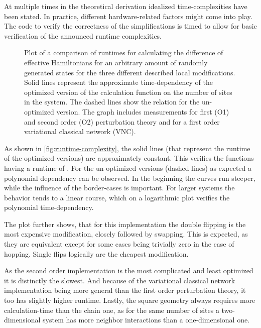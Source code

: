 At multiple times in the theoretical derivation idealized time-complexities have been stated.
In practice, different hardware-related factors might come into play.
The code to verify the correctness of the simplifications is timed to allow for basic verification of the announced runtime complexities.

\begin{figure}[htbp]
    \centering
    \vspace{-0.7cm}
    \caption{
            Plot of a comparison of runtimes for calculating the difference of effective Hamiltonians for an arbitrary amount of randomly generated states for the three different described local modifications. 
            Solid lines represent the approximate time-dependency of the optimized version of the calculation function on the number of sites in the system.
            The dashed lines show the relation for the un-optimized version.
            The graph includes measurements for first (O1) and second order (O2) perturbation theory and for a first order variational classical network (VNC).
        }
    \label{fig:runtime-complexity}
\end{figure}

As shown in \autoref{fig:runtime-complexity}, the solid lines (that represent the runtime of the optimized versions) are approximately constant.
This verifies the functions having a runtime of . 
For the un-optimized versions (dashed lines) as expected a polynomial dependency can be observed.
In the beginning the curves run steeper, while the influence of the border-cases is important. 
For larger systems the behavior tends to a linear course, which on a logarithmic plot verifies the polynomial time-dependency.

The plot further shows, that for this implementation the double flipping is the most expensive modification, closely followed by swapping.
This is expected, as they are equivalent except for some cases being trivially zero in the case of hopping.
Single flips logically are the cheapest modification.

As the second order implementation is the most complicated and least optimized it is distinctly the slowest.
And because of the variational classical network implementation being more general than the first order perturbation theory, it too has slightly higher runtime.
Lastly, the square geometry always requires more calculation-time than the chain one, as for the same number of sites a two-dimensional system has more neighbor interactions than a one-dimensional one.